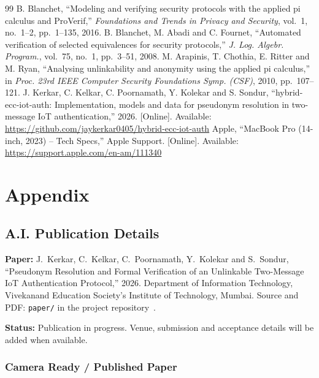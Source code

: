 \begin{thebibliography}{99}
 B. Blanchet, ``Modeling and verifying security protocols with the applied pi calculus and ProVerif,'' \emph{Foundations and Trends in Privacy and Security}, vol.~1, no.~1--2, pp.~1--135, 2016.
 B. Blanchet, M. Abadi and C. Fournet, ``Automated verification of selected equivalences for security protocols,'' \emph{J. Log. Algebr. Program.}, vol.~75, no.~1, pp.~3--51, 2008.
 M. Arapinis, T. Chothia, E. Ritter and M. Ryan, ``Analysing unlinkability and anonymity using the applied pi calculus,'' in \emph{Proc. 23rd IEEE Computer Security Foundations Symp. (CSF)}, 2010, pp.~107--121.
 J. Kerkar, C. Kelkar, C. Poornamath, Y. Kolekar and S. Sondur, ``hybrid-ecc-iot-auth: Implementation, models and data for pseudonym resolution in two-message IoT authentication,'' 2026. [Online]. Available: \url{https://github.com/jaykerkar0405/hybrid-ecc-iot-auth}
 Apple, ``MacBook Pro (14-inch, 2023) -- Tech Specs,'' Apple Support. [Online]. Available: \url{https://support.apple.com/en-am/111340}
\end{thebibliography}

\clearpage
\chapter*{Appendix}

\section*{A.I. Publication Details}
\textbf{Paper:} J.~Kerkar, C.~Kelkar, C.~Poornamath, Y.~Kolekar and S.~Sondur, ``Pseudonym Resolution and Formal Verification of an Unlinkable Two-Message IoT Authentication Protocol,'' 2026. Department of Information Technology, Vivekanand Education Society's Institute of Technology, Mumbai. Source and PDF: \texttt{paper/} in the project repository~\cite{repo}.

\textbf{Status:} Publication in progress. Venue, submission and acceptance details will be added when available.

\subsection*{Camera Ready / Published Paper}
\begin{center}
\end{center}

